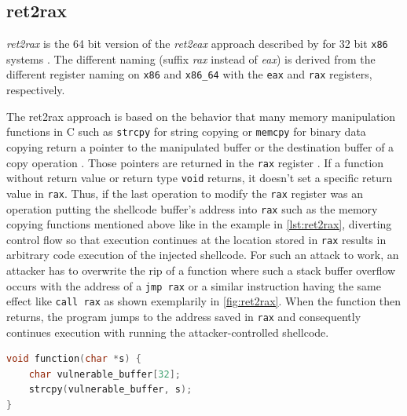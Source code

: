 \subsection{ret2rax}
\label{subsec:aici-ret2rax}

\emph{ret2rax} is the 64 bit version of the \emph{ret2eax} approach described by \citeauthor{Kotler2005} for 32 bit \texttt{x86} systems \cite{Kotler2005}.
The different naming (suffix \emph{rax} instead of \emph{eax}) is derived from the different register naming on \texttt{x86} and \texttt{x86\_64} with the \texttt{eax} and \texttt{rax} registers, respectively.

The ret2rax approach is based on the behavior that many memory manipulation functions in C such as \texttt{strcpy} for string copying or \texttt{memcpy} for binary data copying return a pointer to the manipulated buffer or the destination buffer of a copy operation \cite{Kerrisk2020b,Kerrisk2020c}.
Those pointers are returned in the \texttt{rax} register \cites[24\psq]{Lu2018}[cf.][14]{Lu2015}.
If a function without return value or return type \texttt{void} returns, it doesn't set a specific return value in \texttt{rax}.
Thus, if the last operation to modify the \texttt{rax} register was an operation putting the shellcode buffer's address into \texttt{rax} such as the memory copying functions mentioned above like in the example in \cref{lst:ret2rax}, diverting control flow so that execution continues at the location stored in \texttt{rax} results in arbitrary code execution of the injected shellcode.
For such an attack to work, an attacker has to overwrite the \gls{rip} of a function where such a stack buffer overflow occurs with the address of a \texttt{jmp rax} or a similar instruction having the same effect like \texttt{call rax} as shown exemplarily in \cref{fig:ret2rax}.
When the function then returns, the program jumps to the address saved in \texttt{rax} and consequently continues execution with running the attacker-controlled shellcode.

\begin{lstlisting}[language=C,float=ht,caption={C function with stack buffer overflow vulnerability prone to ret2rax attacks}, label={lst:ret2rax}]
void function(char *s) {
    char vulnerable_buffer[32];
    strcpy(vulnerable_buffer, s);
}
\end{lstlisting}

